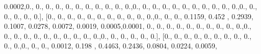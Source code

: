 \documentclass[
]{book}
\newenvironment{Shaded}{\begin{snugshade}}{\end{snugshade}}
\newcommand{\FloatTok}[1]{\textcolor[rgb]{0.00,0.00,0.81}{#1}}
\newcommand{\NormalTok}[1]{#1}
\begin{document}
\begin{Shaded}
\begin{Highlighting}[]
\FloatTok{0.0002}\NormalTok{,}\FloatTok{0.}\NormalTok{, }\FloatTok{0.}\NormalTok{, }\FloatTok{0.}\NormalTok{, }\FloatTok{0.}\NormalTok{, }\FloatTok{0.}\NormalTok{, }\FloatTok{0.}\NormalTok{, }\FloatTok{0.}\NormalTok{, }\FloatTok{0.}\NormalTok{, }\FloatTok{0.}\NormalTok{, }\FloatTok{0.}\NormalTok{, }\FloatTok{0.}\NormalTok{,}\FloatTok{0.}\NormalTok{, }\FloatTok{0.}\NormalTok{, }\FloatTok{0.}\NormalTok{, }\FloatTok{0.}\NormalTok{, }\FloatTok{0.}\NormalTok{, }\FloatTok{0.}\NormalTok{, }\FloatTok{0.}\NormalTok{,}
\FloatTok{0.}\NormalTok{, }\FloatTok{0.}\NormalTok{, }\FloatTok{0.}\NormalTok{, }\FloatTok{0.}\NormalTok{,}\FloatTok{0.}\NormalTok{, }\FloatTok{0.}\NormalTok{, }\FloatTok{0.}\NormalTok{, }\FloatTok{0.}\NormalTok{, }\FloatTok{0.}\NormalTok{, }\FloatTok{0.}\NormalTok{], [}\FloatTok{0.}\NormalTok{, }\FloatTok{0.}\NormalTok{, }\FloatTok{0.}\NormalTok{, }\FloatTok{0.}\NormalTok{, }\FloatTok{0.}\NormalTok{, }\FloatTok{0.}\NormalTok{, }\FloatTok{0.}\NormalTok{, }\FloatTok{0.}\NormalTok{, }\FloatTok{0.}\NormalTok{, }\FloatTok{0.}\NormalTok{,}
\FloatTok{0.}\NormalTok{,}\FloatTok{0.}\NormalTok{, }\FloatTok{0.}\NormalTok{, }\FloatTok{0.}\NormalTok{, }\FloatTok{0.1159}\NormalTok{, }\FloatTok{0.452}\NormalTok{ , }\FloatTok{0.2939}\NormalTok{, }\FloatTok{0.1007}\NormalTok{, }\FloatTok{0.0278}\NormalTok{, }\FloatTok{0.0072}\NormalTok{, }\FloatTok{0.0019}\NormalTok{,}
\FloatTok{0.0005}\NormalTok{,}\FloatTok{0.0001}\NormalTok{, }\FloatTok{0.}\NormalTok{, }\FloatTok{0.}\NormalTok{, }\FloatTok{0.}\NormalTok{, }\FloatTok{0.}\NormalTok{, }\FloatTok{0.}\NormalTok{, }\FloatTok{0.}\NormalTok{, }\FloatTok{0.}\NormalTok{, }\FloatTok{0.}\NormalTok{, }\FloatTok{0.}\NormalTok{, }\FloatTok{0.}\NormalTok{,}\FloatTok{0.}\NormalTok{, }\FloatTok{0.}\NormalTok{, }\FloatTok{0.}\NormalTok{, }\FloatTok{0.}\NormalTok{, }\FloatTok{0.}\NormalTok{, }\FloatTok{0.}\NormalTok{,}
\FloatTok{0.}\NormalTok{, }\FloatTok{0.}\NormalTok{, }\FloatTok{0.}\NormalTok{, }\FloatTok{0.}\NormalTok{, }\FloatTok{0.}\NormalTok{,}\FloatTok{0.}\NormalTok{, }\FloatTok{0.}\NormalTok{, }\FloatTok{0.}\NormalTok{, }\FloatTok{0.}\NormalTok{, }\FloatTok{0.}\NormalTok{, }\FloatTok{0.}\NormalTok{], [}\FloatTok{0.}\NormalTok{, }\FloatTok{0.}\NormalTok{, }\FloatTok{0.}\NormalTok{, }\FloatTok{0.}\NormalTok{, }\FloatTok{0.}\NormalTok{, }\FloatTok{0.}\NormalTok{, }\FloatTok{0.}\NormalTok{, }\FloatTok{0.}\NormalTok{, }\FloatTok{0.}\NormalTok{,}
\FloatTok{0.}\NormalTok{, }\FloatTok{0.}\NormalTok{,}\FloatTok{0.}\NormalTok{, }\FloatTok{0.}\NormalTok{, }\FloatTok{0.}\NormalTok{, }\FloatTok{0.0012}\NormalTok{, }\FloatTok{0.198}\NormalTok{ , }\FloatTok{0.4463}\NormalTok{, }\FloatTok{0.2436}\NormalTok{, }\FloatTok{0.0804}\NormalTok{, }\FloatTok{0.0224}\NormalTok{, }\FloatTok{0.0059}\NormalTok{,}

\end{Highlighting}
\end{Shaded}
\end{document}
